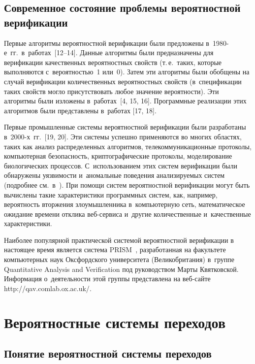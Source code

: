 \begin{multicols}{2}
\subsection{Современное состояние проблемы вероятностной верификации}


Первые алгоритмы вероятностной верификации были предложены в~1980-е~гг.\
в~работах~[12--14]. Данные алгоритмы были предназначены для
верификации качественных вероятностных свойств (т.\,е.\ таких,
которые выполняются с~вероятностью~1 или~0). Затем эти алгоритмы
были обобщены на случай верификации количественных вероятностных
свойств (в~спецификации таких свойств могло присутствовать любое
значение вероятности). Эти алгоритмы были изложены в~работах~[4, 15, 16].
Программные реализации этих алгоритмов были представлены в~работах [17, 18].

Первые промышленные системы вероятностной верификации были
разработаны в~2000-х~гг.~[19, 20]. Эти системы  успешно
применяются во многих областях, таких как анализ распределенных
алгоритмов, телекоммуникационные протоколы, компьютерная
безопасность, криптографические протоколы, моделирование
биологических процессов. С~использованием этих систем верификации
были обнаружены уязвимости и~аномальные поведения анализируемых
систем (подробнее см.\ в~\cite{50}). При помощи систем вероятностной
верификации могут быть вычислены такие характеристики про\-грам\-мных
систем, как, например, вероятность вторжения злоумышленника
в~компьютерную сеть, математическое ожидание времени отклика
веб-сер\-ви\-са и~другие количественные и~качественные характеристики.

Наиболее популярной практической системой вероятностной верификации
в настоящее время является система PRISM~\cite{55},  разработанная
на факультете компьютерных наук Оксфордского университета
(Великобритания) в~группе Quan\-ti\-ta\-ti\-ve Ana\-ly\-sis and
Ve\-ri\-fi\-ca\-ti\-on под руководством Марты Квятковской.
Информация о~деятельности этой группы представлена на веб-сайте
{\sf http://qav.comlab.ox.ac.uk/}.

\section{Вероятностные системы переходов}
\label{fdgfdsgsdfgsdfgrr4444}

\subsection{Понятие вероятностной системы переходов}


\end{multicols}
